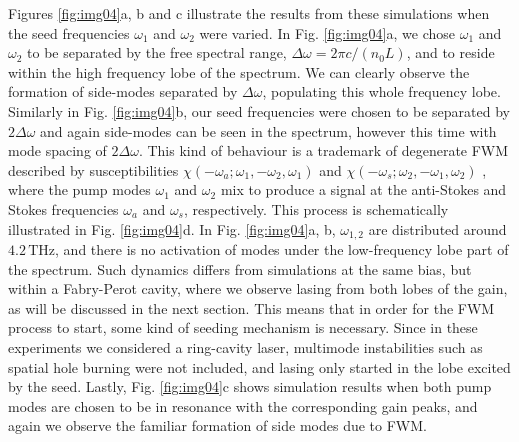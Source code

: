 \documentclass[10pt]{article}
\begin{document}
	Figures \ref{fig:img04}a, b and c illustrate the results from these simulations when the seed frequencies
	$\omega_{1}$ and $\omega_{2}$ were varied. In Fig. \ref{fig:img04}a, we chose
	$\omega_{1}$ and $\omega_{2}$ to be separated by the free spectral range,
	$\Delta\omega=2\pi c/\left(  n_{0}L\right)  $, and to reside within the high
	frequency lobe of the spectrum. We can clearly observe the formation of
	side-modes separated by $\Delta\omega$, populating this whole frequency lobe.
	Similarly in Fig. \ref{fig:img04}b, our seed frequencies were chosen to be
	separated by $2\Delta\omega$ and again side-modes can be seen in the spectrum,
	however this time with mode spacing of $2\Delta\omega$. This kind of behaviour
	is a trademark of degenerate FWM described by susceptibilities $\chi
	(-\omega_{a};\omega_{1},-\omega_{2},\omega_{1})$ and $\chi(-\omega_{s}%
	;\omega_{2},-\omega_{1},\omega_{2})$ \cite{butcher1991elements}, where the
	pump modes $\omega_{1}$ and $\omega_{2}$ mix to produce a signal at the
	anti-Stokes and Stokes frequencies $\omega_{a}$ and $\omega_{s}$,
	respectively. This process is schematically illustrated in Fig.
	\ref{fig:img04}d. In Fig. \ref{fig:img04}a, b, $\omega_{1,2}$ are distributed
	around $4.2{\,}\mathrm{THz}$, and there is no activation of modes under the
	low-frequency lobe part of the spectrum. Such dynamics differs from simulations 
	at the same bias, but within a Fabry-Perot cavity, where we observe lasing 
	from both lobes of the gain, as will be discussed in the next section. 
	This means that in order for the FWM process to start, some kind of
	seeding mechanism is necessary. Since in these experiments we considered a
	ring-cavity laser, multimode instabilities such as spatial hole burning
	\cite{gordon2008multimode} were not included, and lasing only started in the
	lobe excited by the seed.\textrm{ }Lastly, Fig. \ref{fig:img04}c shows
	simulation results when both pump modes are chosen to be in resonance with the
	corresponding gain peaks, and again we observe the familiar formation of side
	modes due to FWM.
	
\end{document}
